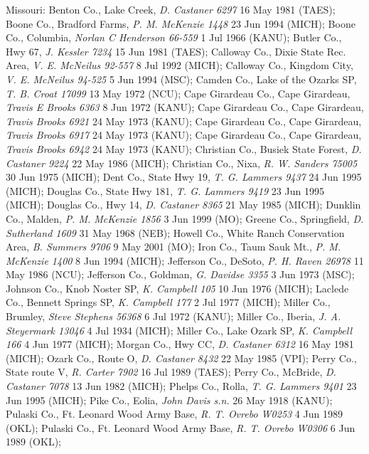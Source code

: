 \documentclass{article}
\begin{document}
Missouri:
Benton Co., Lake Creek, \textit{D. Castaner 6297} 16 May 1981 (TAES);
Boone Co., Bradford Farms, \textit{P. M. McKenzie 1448} 23 Jun 1994 (MICH);
Boone Co., Columbia, \textit{Norlan C Henderson 66-559} 1 Jul 1966 (KANU);
Butler Co., Hwy 67, \textit{J. Kessler 7234} 15 Jun 1981 (TAES);
Calloway Co., Dixie State Rec. Area, \textit{V. E. McNeilus 92-557} 8 Jul 1992 (MICH);
Calloway Co., Kingdom City, \textit{V. E. McNeilus 94-525} 5 Jun 1994 (MSC);
Camden Co., Lake of the Ozarks SP, \textit{T. B. Croat 17099} 13 May 1972 (NCU);
Cape Girardeau Co., Cape Girardeau, \textit{Travis E Brooks 6363} 8 Jun 1972 (KANU);
Cape Girardeau Co., Cape Girardeau, \textit{Travis Brooks 6921} 24 May 1973 (KANU);
Cape Girardeau Co., Cape Girardeau, \textit{Travis Brooks 6917} 24 May 1973 (KANU);
Cape Girardeau Co., Cape Girardeau, \textit{Travis Brooks 6942} 24 May 1973 (KANU);
Christian Co., Busiek State Forest, \textit{D. Castaner 9224} 22 May 1986 (MICH);
Christian Co., Nixa, \textit{R. W. Sanders 75005} 30 Jun 1975 (MICH);
Dent Co., State Hwy 19, \textit{T. G. Lammers 9437} 24 Jun 1995 (MICH);
Douglas Co., State Hwy 181, \textit{T. G. Lammers 9419} 23 Jun 1995 (MICH);
Douglas Co., Hwy 14, \textit{D. Castaner 8365} 21 May 1985 (MICH);
Dunklin Co., Malden, \textit{P. M. McKenzie 1856} 3 Jun 1999 (MO);
Greene Co., Springfield, \textit{D. Sutherland 1609} 31 May 1968 (NEB);
Howell Co., White Ranch Conservation Area, \textit{B. Summers 9706} 9 May 2001 (MO);
Iron Co., Taum Sauk Mt., \textit{P. M. McKenzie 1400} 8 Jun 1994 (MICH);
Jefferson Co., DeSoto, \textit{P. H. Raven 26978} 11 May 1986 (NCU);
Jefferson Co., Goldman, \textit{G. Davidse 3355} 3 Jun 1973 (MSC);
Johnson Co., Knob Noster SP, \textit{K. Campbell 105} 10 Jun 1976 (MICH);
Laclede Co., Bennett Springs SP, \textit{K. Campbell 177} 2 Jul 1977 (MICH);
Miller Co., Brumley, \textit{Steve Stephens 56368} 6 Jul 1972 (KANU);
Miller Co., Iberia, \textit{J. A. Steyermark 13046} 4 Jul 1934 (MICH);
Miller Co., Lake Ozark SP, \textit{K. Campbell 166} 4 Jun 1977 (MICH);
Morgan Co., Hwy CC, \textit{D. Castaner 6312} 16 May 1981 (MICH);
Ozark Co., Route O, \textit{D. Castaner 8432} 22 May 1985 (VPI);
Perry Co., State route V, \textit{R. Carter 7902} 16 Jul 1989 (TAES);
Perry Co., McBride, \textit{D. Castaner 7078} 13 Jun 1982 (MICH);
Phelps Co., Rolla, \textit{T. G. Lammers 9401} 23 Jun 1995 (MICH);
Pike Co., Eolia, \textit{John Davis s.n.} 26 May 1918 (KANU);
Pulaski Co., Ft. Leonard Wood Army Base, \textit{R. T. Ovrebo W0253} 4 Jun 1989 (OKL);
Pulaski Co., Ft. Leonard Wood Army Base, \textit{R. T. Ovrebo W0306} 6 Jun 1989 (OKL);
\end{document}
